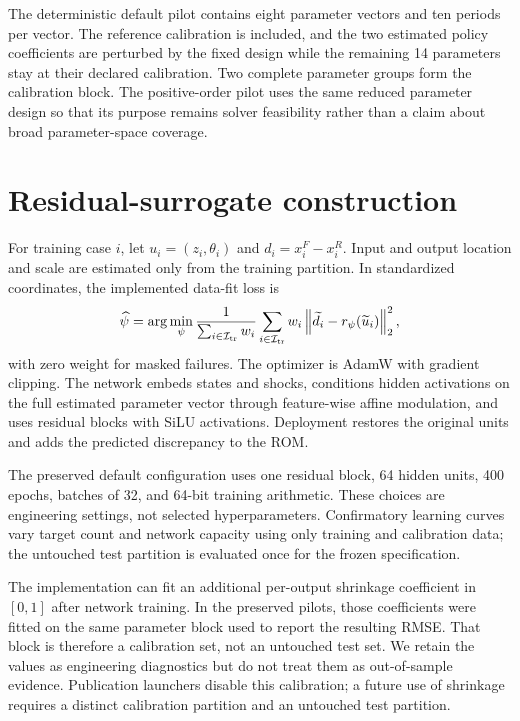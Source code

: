 \documentclass[11pt]{article}
\begin{document}
The deterministic default pilot contains eight parameter vectors and ten
periods per vector. The reference calibration is included, and the two estimated
policy coefficients are perturbed by the fixed design while the remaining 14
parameters stay at their declared calibration. Two complete parameter groups
form the calibration block. The positive-order pilot uses the same reduced
parameter design so that its purpose remains solver feasibility rather than a
claim about broad parameter-space coverage.

\section{Residual-surrogate construction}

For training case $i$, let $u_i=(z_i,\theta_i)$ and
$d_i=x^F_i-x^R_i$. Input and output location and scale are estimated only from
the training partition. In standardized coordinates, the implemented data-fit
loss is
\begin{equation}
  \widehat\psi
  =\arg\min_{\psi}
  \frac{1}{\sum_{i\in\mathcal I_{\rm tr}}w_i}
  \sum_{i\in\mathcal I_{\rm tr}}
  w_i\left\|\widetilde d_i-r_\psi(\widetilde u_i)\right\|_2^2,
  \label{eq:training-loss}
\end{equation}
with zero weight for masked failures. The optimizer is AdamW with gradient
clipping. The network embeds states and shocks, conditions hidden activations
on the full estimated parameter vector through feature-wise affine modulation,
and uses residual blocks with SiLU activations. Deployment restores the original
units and adds the predicted discrepancy to the ROM.

The preserved default configuration uses one residual block, 64 hidden units,
400 epochs, batches of 32, and 64-bit training arithmetic. These choices are
engineering settings, not selected hyperparameters. Confirmatory learning curves
vary target count and network capacity using only training and calibration data;
the untouched test partition is evaluated once for the frozen specification.

The implementation can fit an additional per-output shrinkage coefficient in
$[0,1]$ after network training. In the preserved pilots, those coefficients
were fitted on the same parameter block used to report the resulting RMSE.
That block is therefore a calibration set, not an untouched test set. We retain
the values as engineering diagnostics but do not treat them as out-of-sample
evidence. Publication launchers disable this calibration; a future use of
shrinkage requires a distinct calibration partition and an untouched test
partition.
\end{document}
